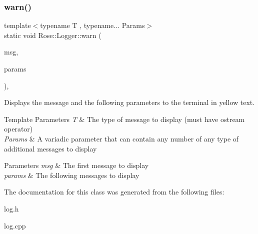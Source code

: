 \subsubsection{\texorpdfstring{warn()}{warn()}\hspace{0.1cm}{\footnotesize\ttfamily [3/3]}}
{\footnotesize\ttfamily template$<$typename T , typename... Params$>$ \\
static void Rose\+::\+Logger\+::warn (\begin{DoxyParamCaption}\item[{T}]{msg,  }\item[{Params...}]{params }\end{DoxyParamCaption})\hspace{0.3cm}{\ttfamily [inline]}, {\ttfamily [static]}}



Displays the message and the following parameters to the terminal in yellow text. 


\begin{DoxyTemplParams}{Template Parameters}
{\em T} & The type of message to display (must have ostream operator)\\
\hline
{\em Params} & A variadic parameter that can contain any number of any type of additional messages to display\\
\hline
\end{DoxyTemplParams}

\begin{DoxyParams}{Parameters}
{\em msg} & The first message to display\\
\hline
{\em params} & The following messages to display \\
\hline
\end{DoxyParams}


The documentation for this class was generated from the following files\+:\begin{DoxyCompactItemize}
\item 
log.\+h\item 
log.\+cpp\end{DoxyCompactItemize}
